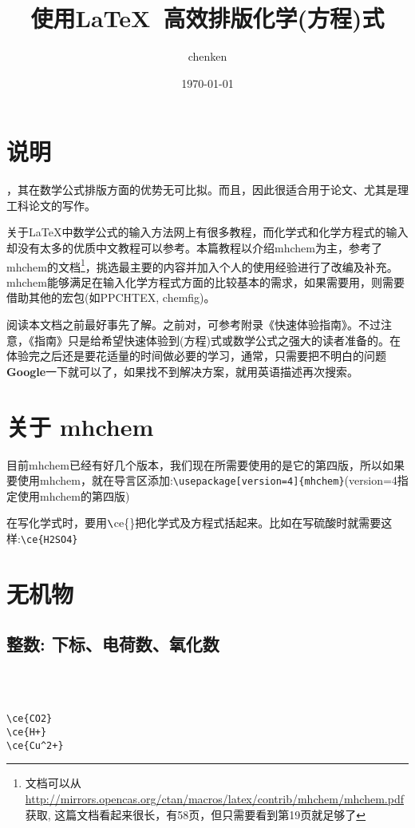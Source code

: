 \documentclass[UTF8, a4paper]{article}
\title{使用\LaTeX\ 高效排版化学(方程)式}
\author{chenken}
\date{\today}
\begin{document}
\maketitle
\tableofcontents
\newpage
\section*{说明}
，其在数学公式排版方面的优势无可比拟。而且，因此很适合用于论文、尤其是理工科论文的写作。

关于LaTeX中数学公式的输入方法网上有很多教程，而化学式和化学方程式的输入却没有太多的优质中文教程可以参考。本篇教程以介绍mhchem为主，参考了mhchem的文档\footnote{文档可以从\url{http://mirrors.opencas.org/ctan/macros/latex/contrib/mhchem/mhchem.pdf}获取, 这篇文档看起来很长，有58页，但只需要看到第19页就足够了}，挑选最主要的内容并加入个人的使用经验进行了改编及补充。mhchem能够满足在输入化学方程式方面的比较基本的需求，如果需要用，则需要借助其他的宏包(如PPCHTEX, chemfig)。

阅读本文档之前最好事先了解。之前对，可参考附录《快速体验指南》。不过注意，《指南》只是给希望快速体验到(方程)式或数学公式之强大的读者准备的。在体验完之后还是要花适量的时间做必要的学习，通常，只需要把不明白的问题\textbf{Google}一下就可以了，如果找不到解决方案，就用英语描述再次搜索。

\section{关于 mhchem}
目前mhchem已经有好几个版本，我们现在所需要使用的是它的第四版，所以如果要使用mhchem，就在导言区添加:\verb|\usepackage[version=4]{mhchem}|(version=4指定使用mhchem的第四版)

在写化学式时，要用$\verb|\|$ce\{\}把化学式及方程式括起来。比如在写硫酸时就需要这样:\verb|\ce{H2SO4}|%
\section{无机物}
\subsection{整数: 下标、电荷数、氧化数}
\begin{minipage}{.3\textwidth}
	\\
	\\
\end{minipage}
\begin{minipage}{.7\textwidth}
	\verb|\ce{CO2}|\\
	\verb|\ce{H+}|\\
	\verb|\ce{Cu^2+}|
\end{minipage}
\end{document}
